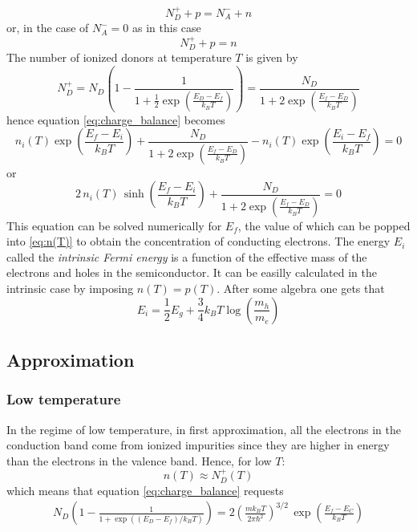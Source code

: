 \documentclass{article}
\begin{document}
\begin{equation*}
    N_D^+ + p = N_A^- + n
\end{equation*}
or, in the case of $N_A^- = 0$ as in this case 
\begin{equation}
    N_D^+ + p = n
    \label{eq:charge_balance}
\end{equation}
The number of ionized donors at temperature $T$ is given by
\begin{equation*}
    N_D^+ = N_D \left(1 - \frac{1}{1+\frac{1}{2}\exp\left(\frac{E_D-E_f}{k_BT}\right)}\right) = \frac{N_D}{1 + 2\exp\left(\frac{E_f-E_D}{k_BT}\right)}
\end{equation*}
hence equation \ref{eq:charge_balance} becomes 
\begin{equation*}
    n_i(T)\exp\left(\frac{E_f-E_i}{k_BT}\right) + \frac{N_D}{1 + 2\exp\left(\frac{E_f-E_D}{k_BT}\right)} - n_i(T)\exp\left(\frac{E_i-E_f}{k_BT}\right) = 0
\end{equation*}
or 
\begin{equation*}
    2 \, n_i(T) \, \sinh\left(\frac{E_f-E_i}{k_BT}\right) + \frac{N_D}{1 + 2\exp\left(\frac{E_f-E_D}{k_BT}\right)} = 0
\end{equation*}
This equation can be solved numerically for $E_f$, the value of which can be popped into \ref{eq:n(T)} to obtain the concentration of conducting electrons.
The energy $E_i$ called the \emph{intrinsic Fermi energy} is a function of the effective mass of the electrons and holes in the semiconductor. It can be easilly calculated
in the intrinsic case by imposing $n(T) = p(T)$. After some algebra one gets that 
\begin{equation*}
    E_i = \frac{1}{2}E_g + \frac{3}{4}k_BT\log\left(\frac{m_h}{m_e}\right)
\end{equation*}

\subsection*{Approximation}
\subsubsection*{Low temperature}
In the regime of low temperature, in first approximation, all the electrons in the conduction band come from ionized impurities since they are higher in energy than the electrons in the valence band.
Hence, for low $T$:
\begin{equation*}
    n(T) \approx N_D^+(T)
\end{equation*}
which means that equation \ref{eq:charge_balance} requests 
\begin{gather*}
    N_D \left(1 - \frac{1}{1+\exp\left((E_D-E_f)/k_BT\right)}\right) = 2 \left(\frac{mk_BT}{2\pi\hbar^2}\right)^{3/2} \, \exp\left(\frac{E_f-E_C}{k_BT}\right)
\end{gather*}
\end{document}
